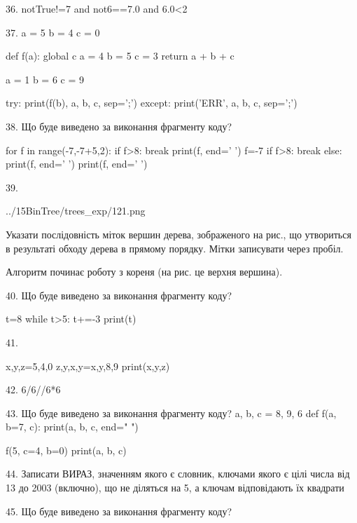 \documentclass[11pt]{article}
\begin{document}
36. 
notTrue!=7 and not6==7.0 and 6.0<2

37. 
a = 5
b = 4
c = 0

def f(a):
global c    a = 4
    b = 5
    c = 3
    return a + b + c

a = 1
b = 6
c = 9

try:
    print(f(b), a, b, c, sep=';')
except:
    print('ERR', a, b, c, sep=';')


38. Що буде виведено за виконання фрагменту коду?

for f in range(-7,-7+5,2):
    if f>8:
        break
    print(f, end=' ')
    f=-7
    if f>8:
        break
else:
    print(f, end=' ')
print(f, end=' ')


39. 

\begin{center}
	{../15BinTree/trees_exp/121.png}
\end{center}
Указати послідовність міток вершин дерева, зображеного на рис., що утвориться в результаті обходу дерева в прямому порядку. Мітки записувати через пробіл.\par Алгоритм починає роботу з кореня (на рис. це верхня вершина).


40. Що буде виведено за виконання фрагменту коду?

t=8
while t>5:
    t+=-3
print(t)



41. 

x,y,z=5,4,0
z,y,x,y=x,y,8,9
print(x,y,z)


42. 
6/6//6*6

43. Що буде виведено за виконання фрагменту коду?
a, b, c = 8, 9, 6
def f(a, b=7, c):
    print(a, b, c, end=" ")

f(5, c=4, b=0)
print(a, b, c)


44. 
Записати ВИРАЗ, значенням якого є словник, ключами якого є цілі числа від 13 до 2003 (включно), що не діляться на 5, а ключам відповідають їх квадрати 

45. Що буде виведено за виконання фрагменту коду?
\end{document}
